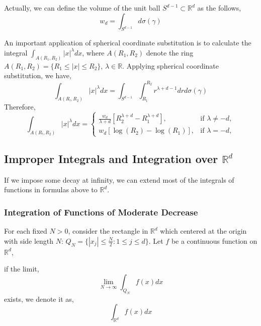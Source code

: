 \documentclass[a4paper]{article}
\numberwithin{equation}{subsection}
\begin{document}
\par Actually, we can define the volume of the unit ball $S^{d-1} \subset \mathbb{R}^d$ as the follows,
\begin{equation}
    w_d = \int_{S^{d-1}} d\sigma(\gamma)
\end{equation}

\par An important application of spherical coordinate substitution is to calculate the integral $\int_{A(R_1, R_2)} \lvert x \rvert^\lambda dx$, where $A(R_1, R_2)$ denote the ring $A(R_1, R_2) = \{R_1 \leq \lvert x \rvert \leq R_2\}$, $\lambda \in \mathbb{R}$. Applying spherical coordinate substitution, we have,
\begin{equation}
    \int_{A(R_!, R_2)} \lvert x \rvert^\lambda dx = \int_{S^{d-1}} \int_{R_1}^{R_2} r^{\lambda+d-1} dr d\sigma(\gamma)
\end{equation}
Therefore,
\begin{equation}
    \int_{A(R_!, R_2)} \lvert x \rvert^\lambda dx =
    \begin{cases}
        \frac{w_d}{\lambda+d} [R_2^{\lambda+d} - R_1^{\lambda+d}], & \text{if $\lambda \ne -d$}, \\
        w_d[\log(R_2) - \log(R_1)], & \text{if $\lambda = -d$},
    \end{cases}
\end{equation}

\subsection{Improper Integrals and Integration over $\mathbb{R}^d$}
\par If we impose some decay at infinity, we can extend most of the integrals of functions in formulas above to $\mathbb{R}^d$.

\subsubsection{Integration of Functions of Moderate Decrease}
\par For each fixed $N>0$, consider the rectangle in $\mathbb{R}^d$ which centered at the origin with side length $N$: $Q_N = \{|x_j| \leq \frac{N}{2} : 1\leq j \leq d\}$. Let $f$ be a continuous function on $\mathbb{R}^d$,
\par if the limit,
\begin{equation}
    \lim_{N\to\infty} \int_{Q_N} f(x)dx
\end{equation}
exists, we denote it as,
\begin{equation}
    \int_{\mathbb{R}^d} f(x) dx
\end{equation}
\end{document}
